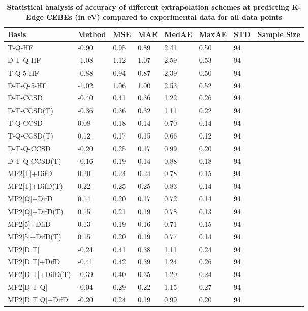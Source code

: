 \begin{table}
  \caption{\textbf{Statistical analysis of accuracy of different extrapolation schemes at predicting K-Edge CEBEs (in eV) compared to experimental data for all data points}}
  \label{tbl:extrap-all-summary}
  \begin{tabular}{l l l l l l l l }
    \toprule
    \textbf{Basis} & \textbf{Method} & \textbf{MSE} & \textbf{MAE} & \textbf{MedAE} & \textbf{MaxAE} & \textbf{STD} & \textbf{Sample Size} \\ 
    \midrule
    T-Q-HF & -0.90 & 0.95 & 0.89 & 2.41 & 0.50 & 94 \\ 
    D-T-Q-HF & -1.08 & 1.12 & 1.07 & 2.59 & 0.53 & 94 \\ 
    T-Q-5-HF & -0.88 & 0.94 & 0.87 & 2.39 & 0.50 & 94 \\ 
    D-T-Q-5-HF & -1.02 & 1.06 & 1.00 & 2.53 & 0.52 & 94 \\ 
    D-T-CCSD & -0.40 & 0.41 & 0.36 & 1.22 & 0.26 & 94 \\ 
    D-T-CCSD(T) & -0.36 & 0.36 & 0.32 & 1.11 & 0.22 & 94 \\ 
    T-Q-CCSD & 0.08 & 0.18 & 0.14 & 0.70 & 0.14 & 94 \\ 
    T-Q-CCSD(T) & 0.12 & 0.17 & 0.15 & 0.66 & 0.12 & 94 \\ 
    D-T-Q-CCSD & -0.20 & 0.25 & 0.17 & 0.99 & 0.20 & 94 \\ 
    D-T-Q-CCSD(T) & -0.16 & 0.19 & 0.14 & 0.88 & 0.18 & 94 \\ 
    MP2[T]+DifD & 0.20 & 0.24 & 0.24 & 0.78 & 0.15 & 94 \\ 
    MP2[T]+DifD(T) & 0.22 & 0.25 & 0.25 & 0.83 & 0.14 & 94 \\ 
    MP2[Q]+DifD & 0.14 & 0.20 & 0.17 & 0.72 & 0.14 & 94 \\ 
    MP2[Q]+DifD(T) & 0.15 & 0.21 & 0.19 & 0.78 & 0.13 & 94 \\ 
    MP2[5]+DifD & 0.13 & 0.19 & 0.16 & 0.71 & 0.15 & 94 \\ 
    MP2[5]+DifD(T) & 0.15 & 0.20 & 0.19 & 0.77 & 0.14 & 94 \\ 
    MP2[D T] & -0.24 & 0.41 & 0.38 & 1.11 & 0.24 & 94 \\ 
    MP2[D T]+DifD & -0.41 & 0.42 & 0.39 & 1.24 & 0.26 & 94 \\ 
    MP2[D T]+DifD(T) & -0.39 & 0.40 & 0.35 & 1.20 & 0.24 & 94 \\ 
    MP2[D T Q] & -0.04 & 0.29 & 0.22 & 1.15 & 0.27 & 94 \\ 
    MP2[D T Q]+DifD & -0.20 & 0.24 & 0.19 & 0.99 & 0.20 & 94 \\ 

\end{tabular}
\end{table}
